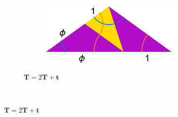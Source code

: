 \documentclass[
  oneside,
  11pt, a4paper,
  footinclude=true,
  headinclude=true,
  cleardoublepage=empty
]{scrbook}
\begin{document}
\begin{figure}[H]
        \centering
        \begin{subfigure}[t]{\textwidth}
        \begin{subfigure}[t]{0.4\textwidth}
                \centering
        \end{subfigure}\hfill \raisebox{30px}{\huge$\rightarrow$} \hfill%
        ~ %
        \begin{subfigure}[t]{0.4\textwidth}
                \centering
                \includegraphics[scale=0.4]{RobFatSub}
        \end{subfigure}
        \caption*{$\textbf{T}=2\textbf{T}+\textbf{t}$}
        \label{fig:RobSubThickAgain}
        \end{subfigure}
        ~ %
          

\end{figure}
\end{document}
